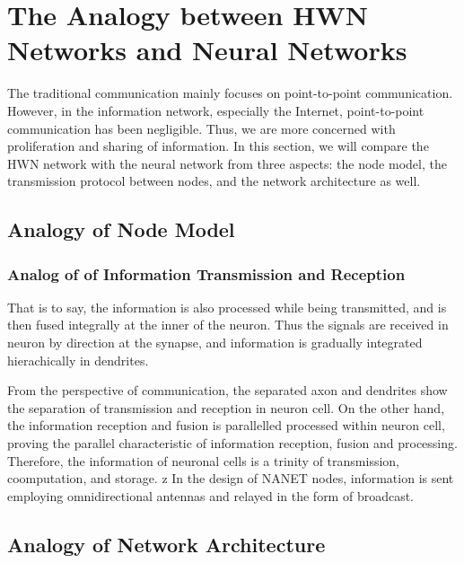 \documentclass[journal,comsoc]{IEEEtran}
\begin{document}
	\section{The Analogy between HWN Networks and Neural Networks}
	\label{section: analogy}
	The traditional communication mainly focuses on point-to-point communication.
	However, in the information network, especially the Internet, point-to-point communication has been negligible. 
	Thus, we are more concerned with proliferation and sharing of information.
	In this section, we will compare the HWN network with the neural network from three aspects: the node model, the transmission protocol between nodes, and the network architecture as well.
	
	\subsection{Analogy of Node Model}
	\label{subsec: analogy_of_node_model}
	
	\subsubsection{Analog of of Information Transmission and Reception}
	That is to say, the information is also processed while being transmitted,  and is then fused integrally at the inner of the neuron.
	Thus the signals are received in neuron by direction at the synapse, and information is gradually integrated hierachically in dendrites.	
	
	From the perspective of communication, the separated axon and dendrites show the separation of transmission and reception in neuron cell. 
	On the other hand, the information reception and fusion is parallelled processed within neuron cell, proving the parallel characteristic of information reception, fusion and processing.
	Therefore, the information of neuronal cells is a trinity of transmission, coomputation, and storage.
	z
	In the design of NANET nodes, information is sent employing omnidirectional antennas and relayed in the form of broadcast. 
	
	\subsection{Analogy of Network Architecture}
	
\end{document}

